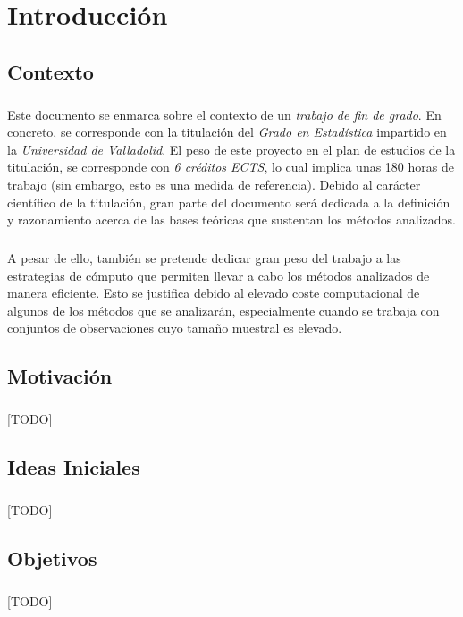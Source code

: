 \documentclass{subfiles}
\begin{document}
  \chapter{Introducción}
  \label{chap:intro}

    \section{Contexto}
    \label{sec:introduction_context}

      \paragraph{}
      Este documento se enmarca sobre el contexto de un \emph{trabajo de fin de grado}. En concreto, se corresponde con la titulación del \emph{Grado en Estadística} impartido en la \emph{Universidad de Valladolid}. El peso de este proyecto en el plan de estudios de la titulación, se corresponde con \emph{6 créditos ECTS}, lo cual implica unas 180 horas de trabajo (sin embargo, esto es una medida de referencia). Debido al carácter científico de la titulación, gran parte del documento será dedicada a la definición y razonamiento acerca de las bases teóricas que sustentan los métodos analizados.

      \paragraph{}
      A pesar de ello, también se pretende dedicar gran peso del trabajo a las estrategias de cómputo que permiten llevar a cabo los métodos analizados de manera eficiente. Esto se justifica debido al elevado coste computacional de algunos de los métodos que se analizarán, especialmente cuando se trabaja con conjuntos de observaciones cuyo tamaño muestral es elevado.

    \section{Motivación}
    \label{sec:introduction_motivation}

      \paragraph{}
      [TODO]

    \section{Ideas Iniciales}
    \label{sec:introduction_initial_ideas}

      \paragraph{}
      [TODO]

    \section{Objetivos}
    \label{sec:introduction_goals}

      \paragraph{}
      [TODO]
\end{document}
